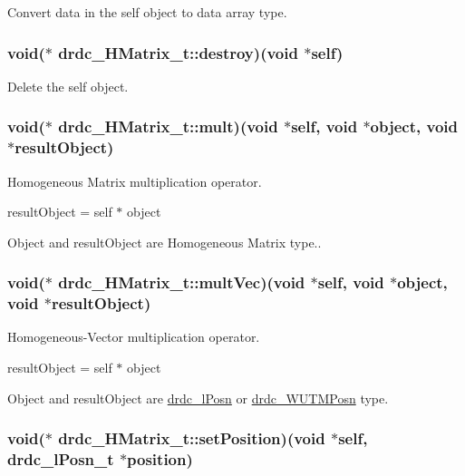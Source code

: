 Convert data in the self object to data array type. 

\hypertarget{structdrdc__HMatrix__t_9dc64b7353043c2f218a3c0b1ad6f7ad}{
\subsubsection[destroy]{\setlength{\rightskip}{0pt plus 5cm}void($\ast$ {\bf drdc\_\-HMatrix\_\-t::destroy})(void $\ast$self)}}
\label{structdrdc__HMatrix__t_9dc64b7353043c2f218a3c0b1ad6f7ad}


Delete the self object. 

\hypertarget{structdrdc__HMatrix__t_79663fad7f7626be17eb5f0f5c3af8ce}{
\subsubsection[mult]{\setlength{\rightskip}{0pt plus 5cm}void($\ast$ {\bf drdc\_\-HMatrix\_\-t::mult})(void $\ast$self, void $\ast$object, void $\ast$resultObject)}}
\label{structdrdc__HMatrix__t_79663fad7f7626be17eb5f0f5c3af8ce}


Homogeneous Matrix multiplication operator. 

resultObject = self $\ast$ object

Object and resultObject are Homogeneous Matrix type.. \hypertarget{structdrdc__HMatrix__t_15d90da71f6fcab0db9b585a8762cd30}{
\subsubsection[multVec]{\setlength{\rightskip}{0pt plus 5cm}void($\ast$ {\bf drdc\_\-HMatrix\_\-t::multVec})(void $\ast$self, void $\ast$object, void $\ast$resultObject)}}
\label{structdrdc__HMatrix__t_15d90da71f6fcab0db9b585a8762cd30}


Homogeneous-Vector multiplication operator. 

resultObject = self $\ast$ object

Object and resultObject are \hyperlink{classdrdc__lPosn}{drdc\_\-lPosn} or \hyperlink{classdrdc__WUTMPosn}{drdc\_\-WUTMPosn} type. \hypertarget{structdrdc__HMatrix__t_7dd237c5e42d0a48106bfd31bedeb99f}{
\subsubsection[setPosition]{\setlength{\rightskip}{0pt plus 5cm}void($\ast$ {\bf drdc\_\-HMatrix\_\-t::setPosition})(void $\ast$self, {\bf drdc\_\-lPosn\_\-t} $\ast$position)}}
\label{structdrdc__HMatrix__t_7dd237c5e42d0a48106bfd31bedeb99f}


